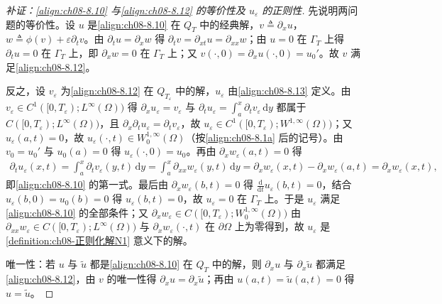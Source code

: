 \documentclass[../../main.tex]{subfiles}%
\begin{document}
\begin{proof}[补证：\eqref{align:ch08-8.10} 与\eqref{align:ch08-8.12} 的等价性及 $u_\varepsilon$ 的正则性]
先说明两问题的等价性。设 $u$ 是\eqref{align:ch08-8.10} 在 $Q_T$ 中的经典解，$v\triangleq\partial_xu$，$w\triangleq\phi(v)+\varepsilon\partial_tv$。由 $\partial_tu=\partial_xw$ 得 $\partial_tv=\partial_{xt}u=\partial_{xx}w$；由 $u=0$ 在 $\Gamma_T$ 上得 $\partial_tu=0$ 在 $\Gamma_T$ 上，即 $\partial_xw=0$ 在 $\Gamma_T$ 上；又 $v(\cdot,0)=\partial_xu(\cdot,0)=u_0'$。故 $v$ 满足\eqref{align:ch08-8.12}。

反之，设 $v_\varepsilon$ 为\eqref{align:ch08-8.12} 在 $Q_{T_\varepsilon}$ 中的解，$u_\varepsilon$ 由\eqref{align:ch08-8.13} 定义。由 $v_\varepsilon\in C^1([0,T_\varepsilon);L^\infty(\Omega))$ 得 $\partial_xu_\varepsilon=v_\varepsilon$ 与 $\partial_tu_\varepsilon=\int_a^x\partial_tv_\varepsilon\,\mathrm{d}y$ 都属于 $C([0,T_\varepsilon);L^\infty(\Omega))$，且 $\partial_x\partial_tu_\varepsilon=\partial_tv_\varepsilon$，故 $u_\varepsilon\in C^1([0,T_\varepsilon);W^{1,\infty}(\Omega))$；又 $u_\varepsilon(a,t)=0$，故 $u_\varepsilon(\cdot,t)\in W^{1,\infty}_0(\Omega)$（按\eqref{align:ch08-8.1a} 后的记号）。由 $v_0=u_0'$ 与 $u_0(a)=0$ 得 $u_\varepsilon(\cdot,0)=u_0$。再由 $\partial_xw_\varepsilon(a,t)=0$ 得
\begin{align*}
\partial_tu_\varepsilon(x,t)=\int_a^x\partial_tv_\varepsilon(y,t)\,\mathrm{d}y
=\int_a^x\partial_{xx}w_\varepsilon(y,t)\,\mathrm{d}y
=\partial_xw_\varepsilon(x,t)-\partial_xw_\varepsilon(a,t)=\partial_xw_\varepsilon(x,t),
\end{align*}
即\eqref{align:ch08-8.10} 的第一式。最后由 $\partial_xw_\varepsilon(b,t)=0$ 得 $\frac{\mathrm{d}}{\mathrm{d}t}u_\varepsilon(b,t)=0$，结合 $u_\varepsilon(b,0)=u_0(b)=0$ 得 $u_\varepsilon(b,t)=0$，故 $u_\varepsilon=0$ 在 $\Gamma_T$ 上。于是 $u_\varepsilon$ 满足\eqref{align:ch08-8.10} 的全部条件；又 $\partial_xw_\varepsilon\in C([0,T_\varepsilon);W^{1,\infty}_0(\Omega))$ 由 $\partial_{xx}w_\varepsilon\in C([0,T_\varepsilon);L^\infty(\Omega))$ 与 $\partial_xw_\varepsilon(\cdot,t)$ 在 $\partial\Omega$ 上为零得到，故 $u_\varepsilon$ 是\cref{definition:ch08-正则化解N1} 意义下的解。

唯一性：若 $u$ 与 $\tilde u$ 都是\eqref{align:ch08-8.10} 在 $Q_T$ 中的解，则 $\partial_xu$ 与 $\partial_x\tilde u$ 都满足\eqref{align:ch08-8.12}，由 $v$ 的唯一性得 $\partial_xu=\partial_x\tilde u$；再由 $u(a,t)=\tilde u(a,t)=0$ 得 $u=\tilde u$。
\end{proof}
\end{document}
